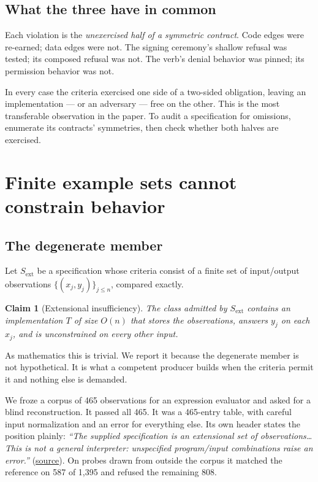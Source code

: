 \documentclass[10pt,twocolumn,letterpaper]{article}
\newcommand{\art}[2]{\href{https://github.com/rz4/reticuli/blob/5318acaac34ef99eeba9ff064a995a6313cc70ec/#1}{#2}}
\newtheorem{claimx}{Claim}
\begin{document}
\subsection{What the three have in common}
Each violation is the \emph{unexercised half of a symmetric contract}. Code edges were re-earned; data edges were not. The signing ceremony's shallow refusal was tested; its composed refusal was not. The verb's denial behavior was pinned; its permission behavior was not.

In every case the criteria exercised one side of a two-sided obligation, leaving an implementation --- or an adversary --- free on the other. This is the most transferable observation in the paper. To audit a specification for omissions, enumerate its contracts' symmetries, then check whether both halves are exercised.

\section{Finite example sets cannot constrain behavior}
\label{sec:extensional}
\subsection{The degenerate member}
Let $S_{\mathrm{ext}}$ be a specification whose criteria consist of a finite set of input/output observations $\{(x_j,y_j)\}_{j\le n}$, compared exactly.

\begin{claimx}[Extensional insufficiency]
The class admitted by $S_{\mathrm{ext}}$ contains an implementation $T$ of size $O(n)$ that stores the observations, answers $y_j$ on each $x_j$, and is unconstrained on every other input.
\end{claimx}

\noindent As mathematics this is trivial. We report it because the degenerate member is not hypothetical. It is what a competent producer builds when the criteria permit it and nothing else is demanded.

We froze a corpus of 465 observations for an expression evaluator and asked for a blind reconstruction. It passed all 465. It was a 465-entry table, with careful input normalization and an error for everything else. Its own header states the position plainly: \emph{``The supplied specification is an extensional set of observations\ldots{} This is not a general interpreter: unspecified program/input combinations raise an error.''} (\art{research/external/jq/evidence/sample1-the-lookup-table.py}{source}). On probes drawn from outside the corpus it matched the reference on 587 of 1{,}395 and refused the remaining 808.
\end{document}
